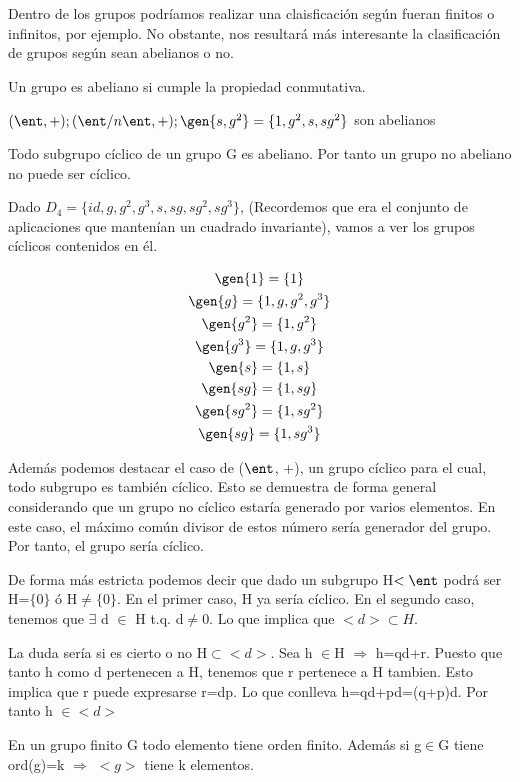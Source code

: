 \documentclass[a4paper,10pt]{apuntes}
\begin{document}
  Dentro de los grupos podríamos realizar una claisficación según fueran finitos o infinitos, por ejemplo. No obstante, nos resultará
  más interesante la clasificación de grupos según sean abelianos o no.
  
  \begin{defn}
   Un grupo es abeliano si cumple la propiedad conmutativa.
  \end{defn}

  \begin{example}  $(\ent, +); (\ent/n\ent, +); \gen{s,g^{2}} =\{1,g^{2},s,sg^{2}\}$ son abelianos
  \end{example}
  
  \begin{lemma}
   Todo subgrupo cíclico de un grupo G es abeliano. Por tanto un grupo no abeliano no puede ser cíclico.
  \end{lemma}

  \begin{example}
   Dado $D_{4}=\{id, g, g^{2}, g^{3}, s, sg, sg^{2},sg^{3}\}$, (Recordemos que era el conjunto de aplicaciones que mantenían un cuadrado invariante), vamos a ver los grupos cíclicos contenidos en él.
   
  \begin{gather*}
  \gen{1}=\{1\} \\
  \gen{g} =\{1,g,g^{2}, g^{3}\}\\
  \gen{g^{2}}=\{1,g^{2}\}\\
  \gen{g^{3}}=\{1,g, g^{3}\}\\
  \gen{s} =\{1,s\}\\
  \gen{sg}=\{1, sg\}\\
  \gen{sg^{2}} =\{1, sg^{2}\}\\
  \gen{sg}=\{1, sg^{3}\}
  \end{gather*}
   
   Además podemos destacar el caso de ($\ent$, +), un grupo cíclico para el cual, todo subgrupo es también cíclico. Esto se demuestra
   de forma general considerando que un grupo no cíclico estaría generado por varios elementos. En este caso, el máximo común
   divisor de estos número sería generador del grupo. Por tanto, el grupo sería cíclico.
 
   De forma más estricta podemos decir que dado un subgrupo H$<\ent$ podrá ser H=$\{0\}$ ó H$\neq\{0\}$. 
   En el primer caso, H ya sería cíclico. En el segundo caso, tenemos que $\exists$  d $\in$  H t.q. d$\neq$0. Lo que implica
   que $<d>\subset H$. 
   
   La duda sería si es cierto o no H$\subset <d>$. Sea h $\in$H  $\Rightarrow$  h=qd+r. Puesto que tanto h como d pertenecen a H,
   tenemos que r pertenece a H tambien. Esto implica que r puede expresarse r=dp. Lo que conlleva h=qd+pd=(q+p)d. Por tanto h $\in <d>$
  \end{example}
  \begin{theorem}
   En un grupo finito G todo elemento tiene orden finito. Además si g$\in$G tiene ord(g)=k $\Rightarrow$  $<g>$  tiene k elementos.
  \end{theorem}
\end{document}
